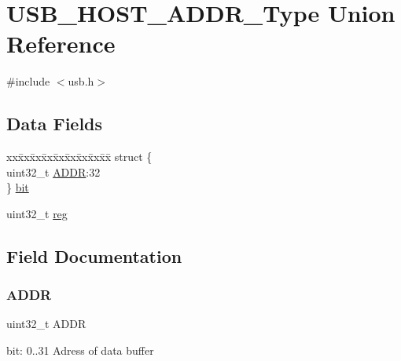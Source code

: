 \hypertarget{union_u_s_b___h_o_s_t___a_d_d_r___type}{}\section{U\+S\+B\+\_\+\+H\+O\+S\+T\+\_\+\+A\+D\+D\+R\+\_\+\+Type Union Reference}
\label{union_u_s_b___h_o_s_t___a_d_d_r___type}


{\ttfamily \#include $<$usb.\+h$>$}

\subsection*{Data Fields}
\begin{DoxyCompactItemize}
\item 
\begin{tabbing}
xx\=xx\=xx\=xx\=xx\=xx\=xx\=xx\=xx\=\kill
struct \{\\
\>uint32\_t \mbox{\hyperlink{union_u_s_b___h_o_s_t___a_d_d_r___type_ac9f49eaa00ec245d66e5342c02bcce9f}{ADDR}}:32\\
\} \mbox{\hyperlink{union_u_s_b___h_o_s_t___a_d_d_r___type_a92ead1c21e6d75f2e934544fb0eb0ad8}{bit}}\\

\end{tabbing}\item 
uint32\+\_\+t \mbox{\hyperlink{union_u_s_b___h_o_s_t___a_d_d_r___type_a6b91636401516a477989a336376d7b40}{reg}}
\end{DoxyCompactItemize}


\subsection{Field Documentation}
\mbox{\label{union_u_s_b___h_o_s_t___a_d_d_r___type_ac9f49eaa00ec245d66e5342c02bcce9f}} 
\subsubsection{\texorpdfstring{ADDR}{ADDR}}
{\footnotesize\ttfamily uint32\+\_\+t A\+D\+DR}

bit\+: 0..31 Adress of data buffer \mbox{\label{union_u_s_b___h_o_s_t___a_d_d_r___type_a92ead1c21e6d75f2e934544fb0eb0ad8}} 

